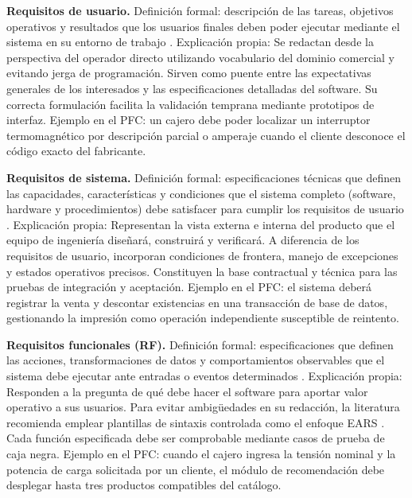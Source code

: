 \documentclass[onecolumn,12pt,a4paper]{IEEEtran}
\begin{document}
	\textbf{Requisitos de usuario.} Definici\'on formal: descripci\'on de las tareas, objetivos operativos y resultados que los usuarios finales deben poder ejecutar mediante el sistema en su entorno de trabajo \cite{iso29148,ireb2023}. Explicaci\'on propia: Se redactan desde la perspectiva del operador directo utilizando vocabulario del dominio comercial y evitando jerga de programaci\'on. Sirven como puente entre las expectativas generales de los interesados y las especificaciones detalladas del software. Su correcta formulaci\'on facilita la validaci\'on temprana mediante prototipos de interfaz. Ejemplo en el PFC: un cajero debe poder localizar un interruptor termomagn\'etico por descripci\'on parcial o amperaje cuando el cliente desconoce el c\'odigo exacto del fabricante.

	\textbf{Requisitos de sistema.} Definici\'on formal: especificaciones t\'ecnicas que definen las capacidades, caracter\'isticas y condiciones que el sistema completo (software, hardware y procedimientos) debe satisfacer para cumplir los requisitos de usuario \cite{iso29148,iso15288}. Explicaci\'on propia: Representan la vista externa e interna del producto que el equipo de ingenier\'ia dise\~nar\'a, construir\'a y verificar\'a. A diferencia de los requisitos de usuario, incorporan condiciones de frontera, manejo de excepciones y estados operativos precisos. Constituyen la base contractual y t\'ecnica para las pruebas de integraci\'on y aceptaci\'on. Ejemplo en el PFC: el sistema deber\'a registrar la venta y descontar existencias en una transacci\'on de base de datos, gestionando la impresi\'on como operaci\'on independiente susceptible de reintento.

	\textbf{Requisitos funcionales (RF).} Definici\'on formal: especificaciones que definen las acciones, transformaciones de datos y comportamientos observables que el sistema debe ejecutar ante entradas o eventos determinados \cite{iso29148,pohl2025,swebok4}. Explicaci\'on propia: Responden a la pregunta de qu\'e debe hacer el software para aportar valor operativo a sus usuarios. Para evitar ambig\"uedades en su redacci\'on, la literatura recomienda emplear plantillas de sintaxis controlada como el enfoque EARS \cite{mavin2009}. Cada funci\'on especificada debe ser comprobable mediante casos de prueba de caja negra. Ejemplo en el PFC: cuando el cajero ingresa la tensi\'on nominal y la potencia de carga solicitada por un cliente, el m\'odulo de recomendaci\'on debe desplegar hasta tres productos compatibles del cat\'alogo.
\end{document}
